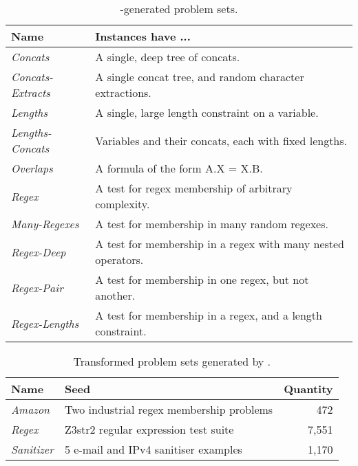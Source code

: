 \begin{table}[t]
    \centering
    \caption{\generator{}-generated problem sets.}
    \label{tbl:generated}
    \begin{tabular}{|l|l|}
        \hline
        \textbf{Name}             & \textbf{Instances have ...} \\ \hline
        \textit{Concats}          & A single, deep tree of concats. \\ \hline
        \textit{Concats-Extracts} & A single concat tree, and random character extractions. \\ \hline
        \textit{Lengths}          & A single, large length constraint on a variable. \\ \hline
        \textit{Lengths-Concats}  & Variables and their concats, each with fixed lengths. \\ \hline
        \textit{Overlaps}         & A formula of the form A.X = X.B. \\ \hline
        \textit{Regex}            & A test for regex membership of arbitrary complexity. \\ \hline
        \textit{Many-Regexes}     & A test for membership in many random regexes. \\ \hline
        \textit{Regex-Deep}       & A test for membership in a regex with many nested operators. \\ \hline
        \textit{Regex-Pair}       & A test for membership in one regex, but not another. \\ \hline
        \textit{Regex-Lengths}    & A test for membership in a regex, and a length constraint. \\ \hline
    \end{tabular}
\end{table}

\begin{table}[t]
    \centering
    \caption{Transformed problem sets generated by \transformer{}.}
    \label{tbl:transformed}
    \begin{tabular}{|l|l|r|}
        \hline
        \textbf{Name}      & \textbf{Seed}                            & \textbf{Quantity} \\ \hline
        \textit{Amazon}    & Two industrial regex membership problems & 472 \\ \hline
        \textit{Regex}     & Z3str2 regular expression test suite     & 7,551 \\ \hline
        \textit{Sanitizer} & 5 e-mail and IPv4 sanitiser examples     & 1,170 \\ \hline
    \end{tabular}
\end{table}
